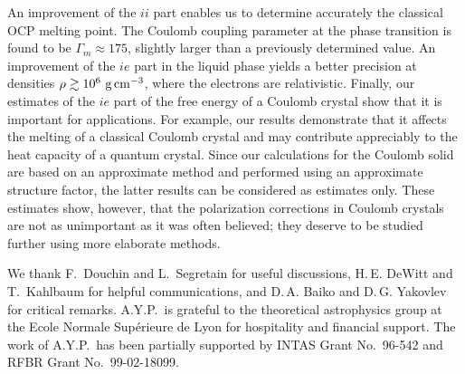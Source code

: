 An improvement of the $ii$ part enables us to determine accurately
the classical OCP melting point.
The Coulomb coupling parameter at the phase transition
is found to be $\Gamma_m\approx175$,
slightly larger than a previously determined value.
An improvement of the $ie$ part in the liquid phase
yields a better precision at densities
$\rho\gtrsim10^6{\rm~g\,cm}^{-3}$, where the electrons are relativistic.
Finally, our estimates of the $ie$ part
of the free energy of a Coulomb crystal
show that it is important for 
applications. For example,
our results demonstrate that it affects the melting
of a classical Coulomb crystal 
and may contribute appreciably 
to the heat capacity of a quantum crystal.
Since our calculations for the Coulomb solid
are based on an approximate method
and performed using an approximate structure factor,
the latter results can be considered as estimates only.
These estimates show, however,
that the polarization corrections in Coulomb crystals
are not as unimportant as it was often believed;
they deserve to be studied further using more elaborate methods.

\begin{acknowledgements}
We thank F.~Douchin and L.~Segretain for useful discussions,
H.\,E. DeWitt and T.~Kahlbaum for helpful communications,
and D.\,A. Baiko and D.\,G. Yakovlev for critical remarks.
A.Y.P.\ is grateful to the theoretical astrophysics group
at the Ecole Normale Sup\'erieure de Lyon for hospitality 
and financial support.
The work of A.Y.P.\ has been partially
supported by INTAS Grant No.\ 96-542
and RFBR Grant No.\ 99-02-18099.
\end{acknowledgements}


